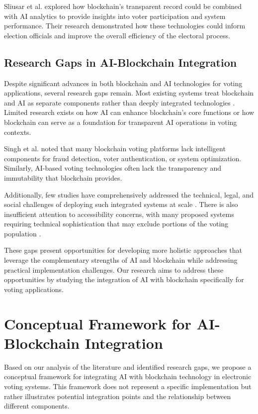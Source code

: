 \documentclass[conference]{IEEEtran}
\begin{document}
Sliusar et al. \cite{b6} explored how blockchain's transparent record could be combined with AI analytics to provide insights into voter participation and system performance. Their research demonstrated how these technologies could inform election officials and improve the overall efficiency of the electoral process.

\subsection{Research Gaps in AI-Blockchain Integration}
Despite significant advances in both blockchain and AI technologies for voting applications, several research gaps remain. Most existing systems treat blockchain and AI as separate components rather than deeply integrated technologies \cite{b6}. Limited research exists on how AI can enhance blockchain's core functions or how blockchain can serve as a foundation for transparent AI operations in voting contexts.

Singh et al. \cite{b7} noted that many blockchain voting platforms lack intelligent components for fraud detection, voter authentication, or system optimization. Similarly, AI-based voting technologies often lack the transparency and immutability that blockchain provides.

Additionally, few studies have comprehensively addressed the technical, legal, and social challenges of deploying such integrated systems at scale \cite{b9}. There is also insufficient attention to accessibility concerns, with many proposed systems requiring technical sophistication that may exclude portions of the voting population \cite{b8}.

These gaps present opportunities for developing more holistic approaches that leverage the complementary strengths of AI and blockchain while addressing practical implementation challenges. Our research aims to address these opportunities by studying the integration of AI with blockchain specifically for voting applications.

\section{Conceptual Framework for AI-Blockchain Integration}
Based on our analysis of the literature and identified research gaps, we propose a conceptual framework for integrating AI with blockchain technology in electronic voting systems. This framework does not represent a specific implementation but rather illustrates potential integration points and the relationship between different components.
\end{document}

